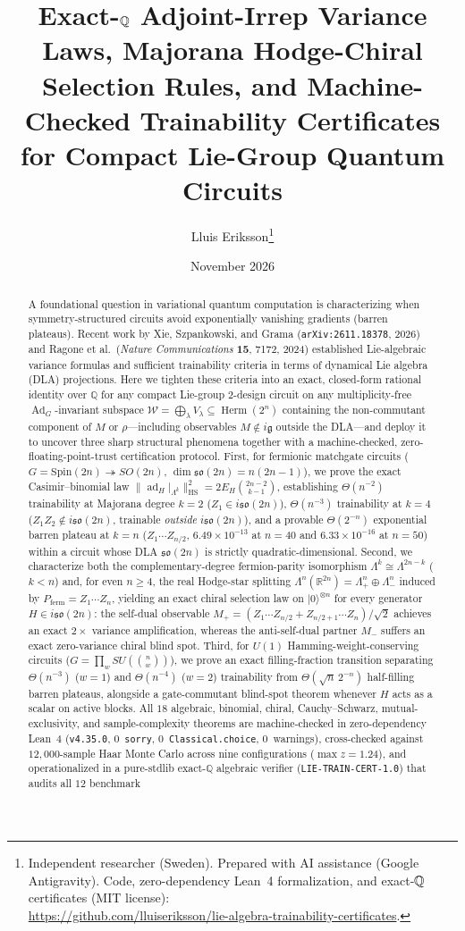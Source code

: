 \documentclass[11pt,a4paper]{article}
\title{\bfseries Exact-$\QQ$ Adjoint-Irrep Variance Laws, Majorana Hodge-Chiral Selection Rules, and Machine-Checked Trainability Certificates for Compact Lie-Group Quantum Circuits}
\author{Lluis Eriksson\thanks{Independent researcher (Sweden). Prepared with AI assistance (Google Antigravity). Code, zero-dependency Lean~4 formalization, and exact-$\QQ$ certificates (MIT license):\\ \url{https://github.com/lluiseriksson/lie-algebra-trainability-certificates}.}}
\date{November 2026}
\theoremstyle{definition}
\theoremstyle{remark}
\newcommand{\QQ}{\mathbb{Q}}
\newcommand{\RR}{\mathbb{R}}
\newcommand{\Ad}{\operatorname{Ad}}
\newcommand{\ad}{\operatorname{ad}}
\newcommand{\HS}{\mathrm{HS}}
\newcommand{\Herm}{\operatorname{Herm}}
\newcommand{\so}{\mathfrak{so}}
\newcommand{\lieg}{\mathfrak{g}}
\newcommand{\certschema}{\texttt{LIE-TRAIN-CERT-1.0}}
\begin{document}
\maketitle

\begin{abstract}
A foundational question in variational quantum computation is characterizing when symmetry-structured circuits avoid exponentially vanishing gradients (barren plateaus). Recent work by Xie, Szpankowski, and Grama (\texttt{arXiv:2611.18378}, 2026) and Ragone et al.\ (\emph{Nature Communications} \textbf{15}, 7172, 2024) established Lie-algebraic variance formulas and sufficient trainability criteria in terms of dynamical Lie algebra (DLA) projections. Here we tighten these criteria into an exact, closed-form rational identity over $\QQ$ for any compact Lie-group $2$-design circuit on any multiplicity-free $\Ad_G$-invariant subspace $\mathcal{W} = \bigoplus_\lambda V_\lambda \subseteq \Herm(2^n)$ containing the non-commutant component of $M$ or $\rho$---including observables $M \notin i\lieg$ outside the DLA---and deploy it to uncover three sharp structural phenomena together with a machine-checked, zero-floating-point-trust certification protocol. First, for fermionic matchgate circuits ($G = \mathrm{Spin}(2n) \twoheadrightarrow SO(2n)$, $\dim\so(2n) = n(2n-1)$), we prove the exact Casimir--binomial law $\|\ad_H|_{\Lambda^k}\|_{\HS}^2 = 2 E_H \binom{2n-2}{k-1}$, establishing $\Theta(n^{-2})$ trainability at Majorana degree $k=2$ ($Z_1 \in i\so(2n)$), $\Theta(n^{-3})$ trainability at $k=4$ ($Z_1 Z_2 \notin i\so(2n)$, trainable \emph{outside} $i\so(2n)$), and a provable $\Theta(2^{-n})$ exponential barren plateau at $k=n$ ($Z_1\cdots Z_{n/2}$, $6.49\times 10^{-13}$ at $n=40$ and $6.33\times 10^{-16}$ at $n=50$) within a circuit whose DLA $\so(2n)$ is strictly quadratic-dimensional. Second, we characterize both the complementary-degree fermion-parity isomorphism $\Lambda^k \cong \Lambda^{2n-k}$ ($k < n$) and, for even $n \ge 4$, the real Hodge-star splitting $\Lambda^n(\RR^{2n}) = \Lambda^n_+ \oplus \Lambda^n_-$ induced by $P_{\mathrm{ferm}} = Z_1\cdots Z_n$, yielding an exact chiral selection law on $|0\rangle^{\otimes n}$ for every generator $H \in i\so(2n)$: the self-dual observable $M_+ = (Z_1\cdots Z_{n/2} + Z_{n/2+1}\cdots Z_n)/\sqrt{2}$ achieves an exact $2\times$ variance amplification, whereas the anti-self-dual partner $M_-$ suffers an exact zero-variance chiral blind spot. Third, for $U(1)$ Hamming-weight-conserving circuits ($G = \prod_w SU(\binom{n}{w})$), we prove an exact filling-fraction transition separating $\Theta(n^{-3})$ ($w=1$) and $\Theta(n^{-4})$ ($w=2$) trainability from $\Theta(\sqrt{n}\,2^{-n})$ half-filling barren plateaus, alongside a gate-commutant blind-spot theorem whenever $H$ acts as a scalar on active blocks. All $18$ algebraic, binomial, chiral, Cauchy--Schwarz, mutual-exclusivity, and sample-complexity theorems are machine-checked in zero-dependency Lean~4 (\texttt{v4.35.0}, $0$~\texttt{sorry}, $0$~\texttt{Classical.choice}, $0$~warnings), cross-checked against $12{,}000$-sample Haar Monte Carlo across nine configurations ($\max z = 1.24$), and operationalized in a pure-stdlib exact-$\QQ$ algebraic verifier (\certschema{}) that audits all $12$ benchmark 
\end{abstract}
\end{document}

